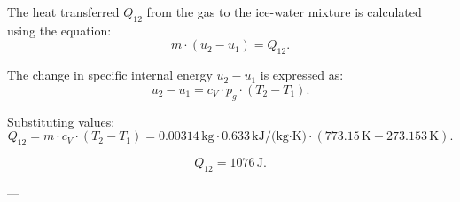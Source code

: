 The heat transferred \( Q_{12} \) from the gas to the ice-water mixture is calculated using the equation:  
\[
m \cdot (u_2 - u_1) = Q_{12}.
\]  

The change in specific internal energy \( u_2 - u_1 \) is expressed as:  
\[
u_2 - u_1 = c_V \cdot p_{g} \cdot (T_2 - T_1).
\]  

Substituting values:  
\[
Q_{12} = m \cdot c_V \cdot (T_2 - T_1) = 0.00314 \, \text{kg} \cdot 0.633 \, \text{kJ/(kg·K)} \cdot (773.15 \, \text{K} - 273.153 \, \text{K}).
\]  

\[
Q_{12} = 1076 \, \text{J}.
\]  

---